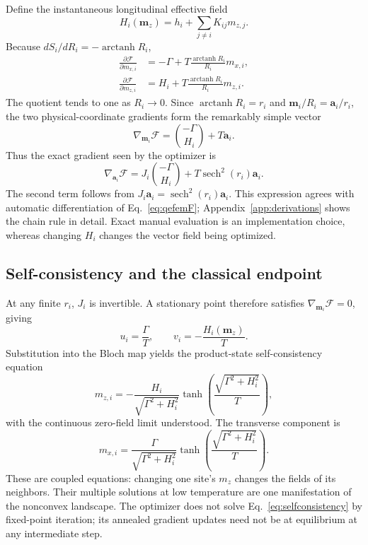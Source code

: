 Define the instantaneous longitudinal effective field
\begin{equation}
 H_i(\bm m_z)=h_i+\sum_{j\ne i}K_{ij}m_{z,j}.
 \label{eq:effectivefield}
\end{equation}
Because $dS_i/dR_i=-\operatorname{arctanh}R_i$,
\begin{align}
 \frac{\partial\mathcal F}{\partial m_{x,i}}
 &=-\Gamma+T\frac{\operatorname{arctanh}R_i}{R_i}m_{x,i},
 \label{eq:gradx}\\
 \frac{\partial\mathcal F}{\partial m_{z,i}}
 &=H_i+T\frac{\operatorname{arctanh}R_i}{R_i}m_{z,i}.
 \label{eq:gradz}
\end{align}
The quotient tends to one as $R_i\to0$. Since
$\operatorname{arctanh}R_i=r_i$ and
$\bm m_i/R_i=\bm a_i/r_i$, the two physical-coordinate
gradients form the remarkably simple vector
\begin{equation}
 \nabla_{\bm m_i}\mathcal F
 =\binom{-\Gamma}{H_i}+T\bm a_i.
 \label{eq:physicalgrad}
\end{equation}
Thus the exact gradient seen by the optimizer is
\begin{equation}
 \boxed{\nabla_{\bm a_i}\mathcal F
 =J_i\binom{-\Gamma}{H_i}
  +T\operatorname{sech}^2(r_i)\bm a_i.}
 \label{eq:fieldgrad}
\end{equation}
The second term follows from $J_i\bm a_i=\operatorname{sech}^2(r_i)\bm a_i$.
This expression agrees with automatic differentiation of
Eq.~\eqref{eq:qefemF}; Appendix~\ref{app:derivations} shows the chain rule
in detail. Exact manual evaluation is an implementation choice, whereas
changing $H_i$ changes the vector field being optimized.

\subsection{Self-consistency and the classical endpoint}

At any finite $r_i$, $J_i$ is invertible. A stationary point therefore
satisfies $\nabla_{\bm m_i}\mathcal F=0$, giving
\begin{equation}
 u_i=\frac{\Gamma}{T},
 \qquad v_i=-\frac{H_i(\bm m_z)}{T}.
 \label{eq:stationaryfields}
\end{equation}
Substitution into the Bloch map yields the product-state self-consistency
equation
\begin{equation}
 m_{z,i}=-\frac{H_i}{\sqrt{\Gamma^2+H_i^2}}
     \tanh\!\left(\frac{\sqrt{\Gamma^2+H_i^2}}{T}\right),
 \label{eq:selfconsistency}
\end{equation}
with the continuous zero-field limit understood. The transverse component is
\begin{equation}
 m_{x,i}=\frac{\Gamma}{\sqrt{\Gamma^2+H_i^2}}
 \tanh\!\left(\frac{\sqrt{\Gamma^2+H_i^2}}{T}\right).
 \label{eq:selfconsistency-x}
\end{equation}
These are coupled equations: changing one site's $m_z$ changes the fields
of its neighbors. Their multiple solutions at low temperature are one
manifestation of the nonconvex landscape. The optimizer does not solve
Eq.~\eqref{eq:selfconsistency} by fixed-point iteration; its annealed
gradient updates need not be at equilibrium at any intermediate step.

